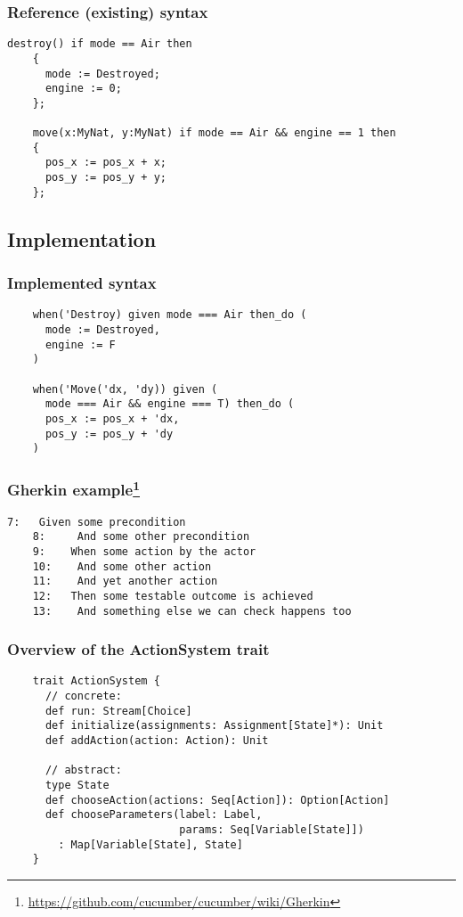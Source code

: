 \documentclass{beamer}
\begin{document}
\begin{frame}[containsverbatim]
  \lstset{gobble=4}
  \frametitle{Reference (existing) syntax}
  \begin{lstlisting}[language={}]
    destroy() if mode == Air then
    {
      mode := Destroyed;
      engine := 0;
    };

    move(x:MyNat, y:MyNat) if mode == Air && engine == 1 then
    {
      pos_x := pos_x + x;
      pos_y := pos_y + y;
    };
  \end{lstlisting}
\end{frame}

\subsection{Implementation}

\begin{frame}[containsverbatim]
  \lstset{gobble=4,deletestring=[b]'}
  \frametitle{Implemented syntax}
  \begin{lstlisting}
    when('Destroy) given mode === Air then_do (
      mode := Destroyed,
      engine := F
    )

    when('Move('dx, 'dy)) given (
      mode === Air && engine === T) then_do (
      pos_x := pos_x + 'dx,
      pos_y := pos_y + 'dy
    )
  \end{lstlisting}
\end{frame}

\begin{frame}[containsverbatim]
  \lstset{gobble=4} 
  \frametitle{Gherkin
    example\footnote{\scriptsize\protect\url{https://github.com/cucumber/cucumber/wiki/Gherkin}}}
  \begin{lstlisting}[language={}]
    7:   Given some precondition
    8:     And some other precondition
    9:    When some action by the actor
    10:    And some other action
    11:    And yet another action
    12:   Then some testable outcome is achieved
    13:    And something else we can check happens too
  \end{lstlisting}
\end{frame}

\begin{frame}[containsverbatim]
  \lstset{gobble=4}
  \frametitle{Overview of the ActionSystem trait}
  \begin{lstlisting}
    trait ActionSystem {
      // concrete:
      def run: Stream[Choice]
      def initialize(assignments: Assignment[State]*): Unit
      def addAction(action: Action): Unit

      // abstract:
      type State
      def chooseAction(actions: Seq[Action]): Option[Action]
      def chooseParameters(label: Label, 
                           params: Seq[Variable[State]]) 
        : Map[Variable[State], State]
    }
  \end{lstlisting}
\end{frame}
\end{document}
